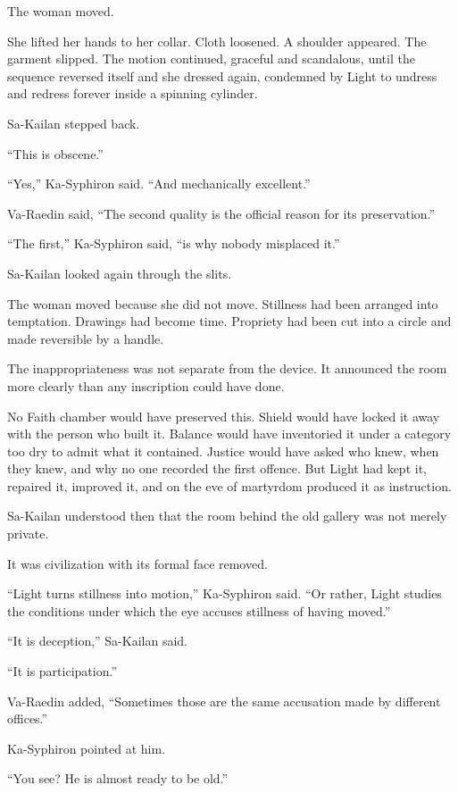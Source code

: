 The woman moved.\par
She lifted her hands to her collar. Cloth loosened. A shoulder appeared. The garment slipped. The motion continued, graceful and scandalous, until the sequence reversed itself and she dressed again, condemned by Light to undress and redress forever inside a spinning cylinder.\par
Sa-Kailan stepped back.\par
“This is obscene.”\par
“Yes,” Ka-Syphiron said. “And mechanically excellent.”\par
Va-Raedin said, “The second quality is the official reason for its preservation.”\par
“The first,” Ka-Syphiron said, “is why nobody misplaced it.”\par
Sa-Kailan looked again through the slits.\par
The woman moved because she did not move. Stillness had been arranged into temptation. Drawings had become time. Propriety had been cut into a circle and made reversible by a handle.\par
The inappropriateness was not separate from the device. It announced the room more clearly than any inscription could have done.\par
No Faith chamber would have preserved this. Shield would have locked it away with the person who built it. Balance would have inventoried it under a category too dry to admit what it contained. Justice would have asked who knew, when they knew, and why no one recorded the first offence. But Light had kept it, repaired it, improved it, and on the eve of martyrdom produced it as instruction.\par
Sa-Kailan understood then that the room behind the old gallery was not merely private.\par
It was civilization with its formal face removed.\par
“Light turns stillness into motion,” Ka-Syphiron said. “Or rather, Light studies the conditions under which the eye accuses stillness of having moved.”\par
“It is deception,” Sa-Kailan said.\par
“It is participation.”\par
Va-Raedin added, “Sometimes those are the same accusation made by different offices.”\par
Ka-Syphiron pointed at him.\par
“You see? He is almost ready to be old.”\par
